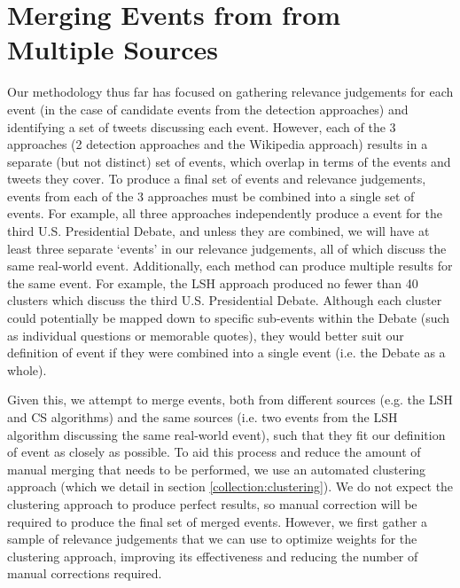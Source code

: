\section{Merging Events from from Multiple Sources}
\label{sec:merge}
Our methodology thus far has focused on gathering relevance judgements for each event (in the case of candidate events from the detection approaches) and identifying a set of tweets discussing each event.
However, each of the 3 approaches (2 detection approaches and the Wikipedia approach) results in a separate (but not distinct) set of events, which overlap in terms of the events and tweets they cover.
To produce a final set of events and relevance judgements, events from each of the 3 approaches must be combined into a single set of events.
For example, all three approaches independently produce a event for the third U.S. Presidential Debate, and unless they are combined, we will have at least three separate `events' in our relevance judgements, all of which discuss the same real-world event.
Additionally, each method can produce multiple results for the same event.
For example, the LSH approach produced no fewer than 40 clusters which discuss the third U.S. Presidential Debate.
Although each cluster could potentially be mapped down to specific sub-events within the Debate (such as individual questions or memorable quotes), they would better suit our definition of event if they were combined into a single event (i.e. the Debate as a whole).


Given this, we attempt to merge events, both from different sources (e.g. the LSH and CS algorithms) and the same sources (i.e. two events from the LSH algorithm discussing the same real-world event), such that they fit our definition of event as closely as possible.
To aid this process and reduce the amount of manual merging that needs to be performed, we use an automated clustering approach (which we detail in section \ref{collection:clustering}).
We do not expect the clustering approach to produce perfect results, so manual correction will be required to produce the final set of merged events.
However, we first gather a sample of relevance judgements that we can use to optimize weights for the clustering approach, improving its effectiveness and reducing the number of manual corrections required.

